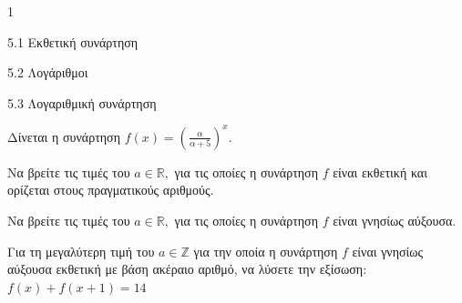 \begin{ylh}{1}
\item 5.1 Εκθετική συνάρτηση
\item 5.2 Λογάριθμοι
\item 5.3 Λογαριθμική συνάρτηση
\end{ylh}
Δίνεται η συνάρτηση $f(x) = \left( \frac{\alpha}{\alpha + 5} \right)^{x}.$
\begin{alist}
\item Να βρείτε τις τιμές του $a \in {\mathbb{R}},$ για τις οποίες η συνάρτηση $f$ είναι εκθετική και ορίζεται στους πραγματικούς αριθμούς.
\item Να βρείτε τις τιμές του $a \in {\mathbb{R}},$ για τις οποίες η συνάρτηση $f$ είναι γνησίως αύξουσα.
\item Για τη μεγαλύτερη τιμή του $a \in {\mathbb{Z}}$ για την οποία η συνάρτηση $f$ είναι γνησίως αύξουσα εκθετική με βάση ακέραιο αριθμό, να λύσετε την εξίσωση:
$f(x) + f(x + 1) = 14$
\end{alist}

